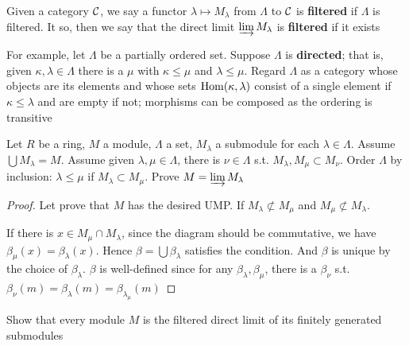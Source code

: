 \documentclass[11pt]{article}
\begin{document}
Given a category \(\mathcal{C}\), we say a functor \(\lambda\mapsto M_\lambda\)
from \(\Lambda\) to \(\mathcal{C}\) is \textbf{filtered} if \(\Lambda\) is filtered. It so, then we say that the
direct limit \(\varinjlim M_\lambda\) is \textbf{filtered} if it exists

For example, let \(\Lambda\) be a partially ordered set. Suppose \(\Lambda\) is \textbf{directed}; that
is, given \(\kappa,\lambda\in\Lambda\) there is a \(\mu\) with \(\kappa\le\mu\) and
\(\lambda\le\mu\). Regard \(\Lambda\) as a category whose objects are its elements and
whose sets \(\operatorname{Hom}(\kappa,\lambda)\) consist of a single element if \(\kappa\le\lambda\)
and are empty if not; morphisms can be composed as the ordering is transitive

\begin{exercise}
\label{7.2}
Let \(R\) be a ring, \(M\) a module, \(\Lambda\) a set, \(M_\lambda\) a submodule for
each \(\lambda\in\Lambda\). Assume \(\bigcup M_\lambda=M\). Assume given
\(\lambda,\mu\in\Lambda\), there is \(\nu\in\Lambda\) s.t. \(M_\lambda,M_\mu\subset
   M_\nu\). Order \(\Lambda\) by inclusion: \(\lambda\le\mu\) if \(M_\lambda\subset
   M_\mu\). Prove \(M=\varinjlim M_\lambda\)
\end{exercise}

\begin{proof}
Let prove that \(M\) has the desired UMP.
If \(M_\lambda\not\subset M_\mu\) and
\(M_\mu\not\subset M_\lambda\).
\begin{center}
\end{center}
If there is \(x\in M_\mu\cap M_\lambda\), since the diagram should be
commutative, we have \(\beta_\mu(x)=\beta_\lambda(x)\). Hence
\(\beta=\bigcup\beta_\lambda\) satisfies the condition. And \(\beta\) is unique by
the choice of \(\beta_\lambda\). \(\beta\) is well-defined since for any
\(\beta_\lambda,\beta_\mu\), there is a \(\beta_\nu\) s.t.
\(\beta_\nu(m)=\beta_\lambda(
   m)=\beta_\lambda_\mu(m)\)
\end{proof}

\begin{exercise}
\label{7.3}
Show that every module \(M\) is the filtered direct limit of its finitely
generated submodules
\end{exercise}
\end{document}
